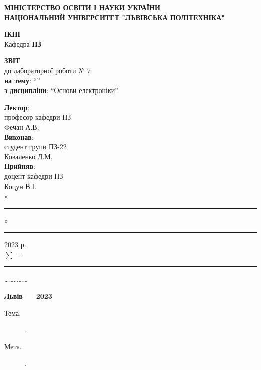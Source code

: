 \documentclass{article}
\newcommand\subject{Основи електроніки}
\newcommand\lecturer{професор кафедри ПЗ \\ Фечан А.В.}
\newcommand\teacher{доцент кафедри ПЗ \\ Коцун В.І.}
\newcommand\mygroup{ПЗ-22}
\newcommand\lab{7}
\newcommand\theme{}
\newcommand\purpose{}
\begin{document}
\begin{normalsize}
	\begin{titlepage}
		\thispagestyle{empty}
		\begin{center}
			\textbf{МІНІСТЕРСТВО ОСВІТИ І НАУКИ УКРАЇНИ\\
				НАЦІОНАЛЬНИЙ УНІВЕРСИТЕТ "ЛЬВІВСЬКА ПОЛІТЕХНІКА"}
		\end{center}
		\begin{flushright}
			\textbf{ІКНІ}\\
			Кафедра \textbf{ПЗ}
		\end{flushright}
		\vspace{200pt}
		\begin{center}
			\textbf{ЗВІТ}\\
			\vspace{10pt}
			до лабораторної роботи № \lab\\
			\textbf{на тему}: “\textit{\theme}”\\
			\textbf{з дисципліни}: “\subject”
		\end{center}
		\vspace{112pt}
		\begin{flushright}
			
			\textbf{Лектор}:\\
			\lecturer\\
			\vspace{28pt}
			\textbf{Виконав}:\\
			
			студент групи \mygroup\\
			Коваленко Д.М.\\
			\vspace{28pt}
			\textbf{Прийняв}:\\
			
			\teacher\\
			
			\vspace{28pt}
			«\rule{1cm}{0.15mm}» \rule{1.5cm}{0.15mm} 2023 р.\\
			$\sum$ = \rule{1cm}{0.15mm}……………\\
			
		\end{flushright}
		\vspace{\fill}
		\begin{center}
			\textbf{Львів — 2023}
		\end{center}
	\end{titlepage}
		
	\begin{description}
		\item[Тема.] \theme.
		\item[Мета.] \purpose.
	\end{description}


\end{normalsize}
\end{document}
